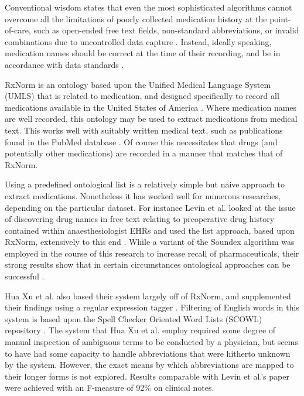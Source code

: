 Conventional wisdom states that even the most sophisticated algorithms cannot overcome all the limitations of poorly collected medication history at the point-of-care, such as open-ended free text fields, non-standard abbreviations, or invalid combinations due to uncontrolled data capture \cite{bennett2012utilizing}. Instead, ideally speaking, medication names should be correct at the time of their recording, and be in accordance with data standards \cite{richesson2010achieving}.

 
RxNorm is an ontology based upon the Unified Medical Language System (UMLS)\cite{bodenreider2004unified} that is related to medication, and designed specifically to record all medications available in the United States of America \cite{nelson2011normalized}. Where medication names are well recorded, this ontology may be used to extract medications from medical text. This works well with suitably written medical text, such as publications found in the PubMed  database \cite{kanavos2014pubmed}. Of course this necessitates that drugs (and potentially other medications) are recorded in a manner that matches that of RxNorm. 

Using a predefined ontological list is a relatively simple but naive approach to extract medications. Nonetheless it has worked well for numerous researches, depending on the particular dataset. For instance  Levin et al. looked at the issue of discovering drug names in free text relating to preoperative drug history contained within anaesthesiologist EHRs and used the list approach, based upon RxNorm, extensively  to this end \cite{levin2007extraction}. While a variant of the Soundex algorithm \cite{mckenna1998client} was employed in the course of this research to increase recall of pharmaceuticals, their strong results show that in certain circumstances ontological approaches can be successful \cite{levin2007extraction}.



Hua Xu et al. also based their system largely off of RxNorm, and supplemented their findings using a regular expression tagger \cite{xu2010medex}. Filtering of English words in this system is based upon the Spell Checker Oriented Word Lists (SCOWL) repository \cite{atkinson2004spell}. The system that Hua Xu et al. employ required some degree of manual inspection of ambiguous terms to be conducted by a physician, but seems to have had some capacity to handle abbreviations that were hitherto unknown by the system. However, the exact means by which abbreviations are mapped to their longer forms is not explored.  Results comparable with Levin et al.'s paper were achieved with an F-measure of 92\% on clinical notes. 

